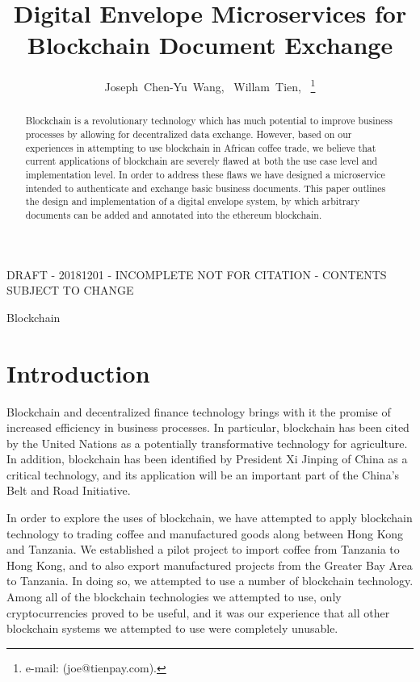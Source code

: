 \documentclass[journal]{IEEEtran}
\begin{document}
\title{Digital Envelope Microservices for Blockchain Document Exchange}
\author{Joseph~Chen-Yu~Wang,~
Willam~Tien,~
\thanks{e-mail: (joe@tienpay.com).}}
\maketitle

DRAFT - 20181201 - INCOMPLETE NOT FOR CITATION - CONTENTS SUBJECT TO CHANGE

\begin{abstract}
Blockchain is a revolutionary technology which has much potential to
improve business processes by allowing for decentralized data
exchange.  However, based on our experiences in attempting to use
blockchain in African coffee trade, we believe that current
applications of blockchain are severely flawed at both the use case
level and implementation level.  In order to address these flaws
we have designed a microservice intended to authenticate and exchange
basic business documents.  This paper outlines the design and
implementation of a digital envelope system, by which arbitrary
documents can be added and annotated into the ethereum blockchain.
\end{abstract}


\begin{IEEEkeywords}
Blockchain
\end{IEEEkeywords}

\section{Introduction}
Blockchain and decentralized finance technology brings with it the
promise of increased efficiency in business processes.  In particular,
blockchain has been cited by the United Nations as a potentially
transformative technology for agriculture.\cite{fao:blockchain} In
addition, blockchain has been identified by President Xi Jinping of
China as a critical technology\cite{xi}, and its application will be an
important part of the China's Belt and Road Initiative.

In order to explore the uses of blockchain, we have attempted to apply
blockchain technology to trading coffee and manufactured goods along
between Hong Kong and Tanzania.  We established a pilot project to
import coffee from Tanzania to Hong Kong, and to also export
manufactured projects from the Greater Bay Area to Tanzania.  In doing
so, we attempted to use a number of blockchain technology.  Among all
of the blockchain technologies we attempted to use, only
cryptocurrencies proved to be useful, and it was our experience that
all other blockchain systems we attempted to use were completely
unusable.
\end{document}

